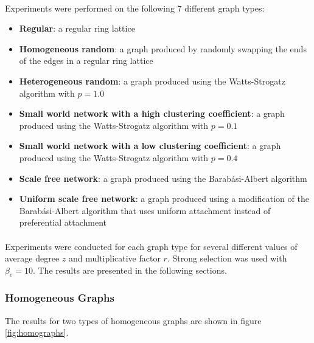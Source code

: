 \documentclass{article}
\begin{document}
	\paragraph{}Experiments were performed on the following 7 different graph types:
	\begin{itemize}
		\item \textbf{Regular}: a regular ring lattice
		\item \textbf{Homogeneous random}: a graph produced by randomly swapping the ends of the edges in a regular ring lattice
		\item \textbf{Heterogeneous random}: a graph produced using the Watts-Strogatz algorithm \cite{Watts1998} with $p = 1.0$
		\item \textbf{Small world network with a high clustering coefficient}: a graph produced using the Watts-Strogatz algorithm with $p = 0.1$
		\item \textbf{Small world network with a low clustering coefficient}: a graph produced using the Watts-Strogatz algorithm with $p = 0.4$
		\item \textbf{Scale free network}: a graph produced using the Barab\'{a}si-Albert algorithm \cite{Barabasi1999}
		\item \textbf{Uniform scale free network}: a graph produced using a modification of the Barab\'{a}si-Albert algorithm that uses uniform attachment instead of preferential attachment
	\end{itemize}

	\paragraph{}Experiments were conducted for each graph type for several different values of average degree $z$ and multiplicative factor $r$.  Strong selection was used with $\beta_e=10$.  The results are presented in the following sections.

	\subsubsection{Homogeneous Graphs}
	The results for two types of homogeneous graphs are shown in figure \ref{fig:homographs}.
\end{document}
